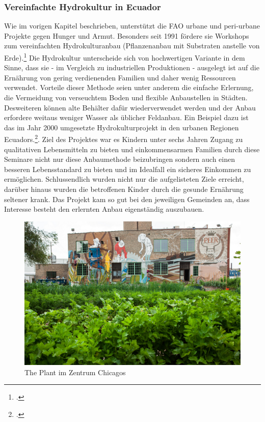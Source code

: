 \documentclass{scrartcl}
\begin{document}
\subsubsection*{Vereinfachte Hydrokultur in Ecuador}
Wie im vorigen Kapitel beschrieben, unterstützt die FAO urbane und peri-urbane Projekte gegen Hunger und Armut. Besonders seit 1991 fördere sie Workshops zum vereinfachten Hydrokulturanbau (Pflanzenanbau mit Substraten anstelle von Erde).\footcites[Vgl.][o.P. (S.1)]{Stajano2003SIMPLIFIEDEcuador} Die  Hydrokultur unterscheide sich von hochwertigen Variante in dem Sinne, dass sie - im Vergleich zu industriellen Produktionen - ausgelegt ist auf die Ernährung von gering verdienenden Familien und daher wenig Ressourcen verwendet. Vorteile dieser Methode seien unter anderem die einfache Erlernung, die Vermeidung von verseuchtem Boden und flexible Anbaustellen in Städten. Desweiteren können alte Behälter dafür wiederverwendet werden und der Anbau erfordere weitaus weniger Wasser als üblicher Feldanbau. Ein Beispiel dazu ist das im Jahr 2000 umgesetzte Hydrokulturprojekt in den urbanen Regionen Ecuadors.\footcite[Vgl.][o.P. (S.2f)]{Stajano2003SIMPLIFIEDEcuador}. Ziel des Projektes war es Kindern unter sechs Jahren Zugang zu qualitativen Lebensmitteln zu bieten und einkommensarmen Familien durch diese Seminare nicht nur diese Anbaumethode beizubringen sondern auch einen besseren Lebensstandard zu bieten und im Idealfall ein sicheres Einkommen zu ermöglichen. Schlussendlich wurden nicht nur die aufgelisteten Ziele erreicht, darüber hinaus wurden die betroffenen Kinder durch die gesunde Ernährung seltener krank. Das Projekt kam so gut bei den jeweiligen Gemeinden an, dass Interesse besteht den erlernten Anbau eigenständig auszubauen. 

\begin{figure}[htbp]
    \centering
    \includegraphics[width=14cm]{image_folder/the_plant_1.jpg}
    \caption{The Plant im Zentrum Chicagos}
\end{figure} 
\end{document}
